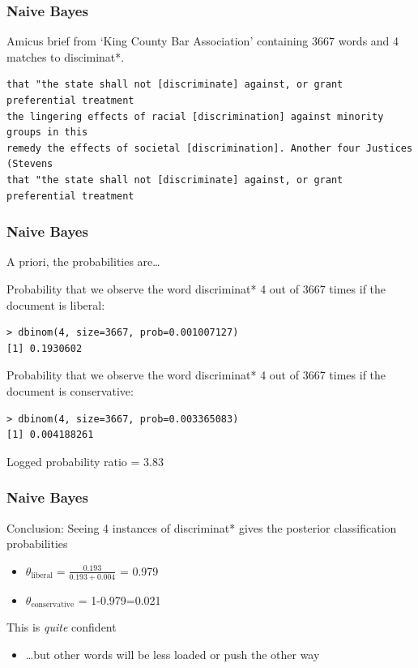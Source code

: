 \documentclass[11pt,compress,professionalfonts]{beamer}
\newcommand{\ita}{\begin{itemize}}
\newcommand{\itm}{\item[]}
\newcommand{\itz}{\end{itemize}}
\begin{document}
\begin{frame}[t,fragile]\frametitle{Naive Bayes}

Amicus brief from `King County Bar Association' containing 3667 words and 4 matches to disciminat*.

{\scriptsize
\begin{verbatim}
that "the state shall not [discriminate] against, or grant preferential treatment
the lingering effects of racial [discrimination] against minority groups in this
remedy the effects of societal [discrimination]. Another four Justices (Stevens
that "the state shall not [discriminate] against, or grant preferential treatment
\end{verbatim}
}
\end{frame}


\begin{frame}[t,fragile]\frametitle{Naive Bayes}
A priori, the probabilities are\ldots

Probability that we observe the word  discriminat* 4 out of 3667 times if the document is liberal:
{\small
\begin{verbatim}
> dbinom(4, size=3667, prob=0.001007127)
[1] 0.1930602
\end{verbatim}
}
Probability that we observe the word  discriminat* 4 out of 3667 times if the document is conservative:
{\small
\begin{verbatim}
> dbinom(4, size=3667, prob=0.003365083)
[1] 0.004188261
\end{verbatim}
}
Logged probability ratio = 3.83
\newpage
\end{frame}


\begin{frame}[t,fragile]\frametitle{Naive Bayes}

Conclusion: Seeing 4 instances of discriminat* gives the posterior classification probabilities
\ita
\itm $\theta_\text{liberal} = \frac{0.193}{0.193+0.004}$ = 0.979
\itm $\theta_\text{conservative}$ =  1-0.979=0.021
\itz

This is \textit{quite} confident
\ita
\itm \ldots but other words will be less loaded or push the other way
\itz
\end{frame}



\end{document}
